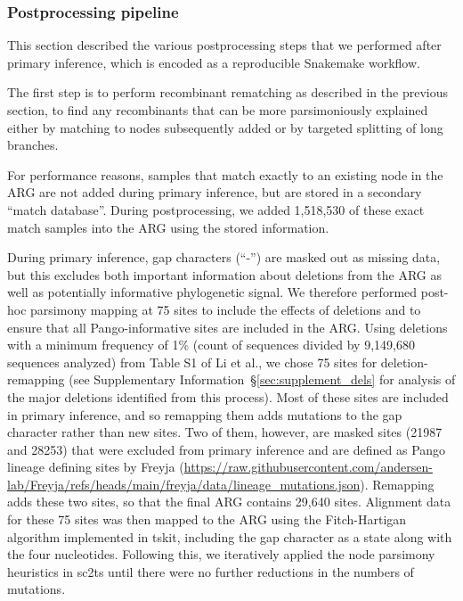 \documentclass[12pt]{article}
\newcommand{\supref}[1]{Supplementary Information~\S\ref{#1}}
\begin{document}

\subsubsection*{Postprocessing pipeline}
\label{sec:arg_postprocessing}
This section described the various postprocessing steps that
we performed after primary inference,
which is encoded as a reproducible Snakemake
workflow. %

The first step is to perform recombinant rematching as described in the previous
section, to find any recombinants that can be more parsimoniously explained
either by matching to nodes subsequently added or by targeted
splitting of long branches.

For performance reasons, samples that match exactly to an existing
node in the ARG are not added during primary inference, but are
stored in a secondary ``match database''.
During postprocessing, we added 1,518,530 of these exact match samples
into the ARG using the stored information.

During primary inference, gap characters (``-'') are masked
out as missing data, but this excludes both important information
about deletions from the ARG as well as potentially informative
phylogenetic signal.
We therefore performed post-hoc parsimony mapping at 75 sites to include
the effects of deletions and to ensure that all Pango-informative
sites are included in the ARG.
Using deletions with a minimum frequency of 1\%
(count of sequences divided by 9,149,680 sequences analyzed)
from Table S1 of Li et al.\cite{Li2023indels},
we chose 75 sites for deletion-remapping (see \supref{sec:supplement_dels}
for analysis of the major deletions identified from this process).
Most of these sites are included in primary inference, and so
remapping them adds mutations to the gap character
rather than new sites.
Two of them, however, are masked sites
(21987 and 28253) that were excluded
from primary inference and are defined as Pango lineage
defining sites by Freyja\cite{Karthikeyan2022}
(\url{https://raw.githubusercontent.com/andersen-lab/Freyja/refs/heads/main/freyja/data/lineage\_mutations.json}).
Remapping adds these two sites,
so that the final ARG contains 29,640 sites.
Alignment data for these 75 sites was then mapped to the
ARG using the Fitch-Hartigan algorithm\cite{Fitch1971toward,Hartigan1973minimum}
implemented in tskit, including the gap character as a state
along with the four nucleotides.
Following this, we iteratively applied the node parsimony
heuristics in sc2ts until there were no further reductions in
the numbers of mutations.
\end{document}
